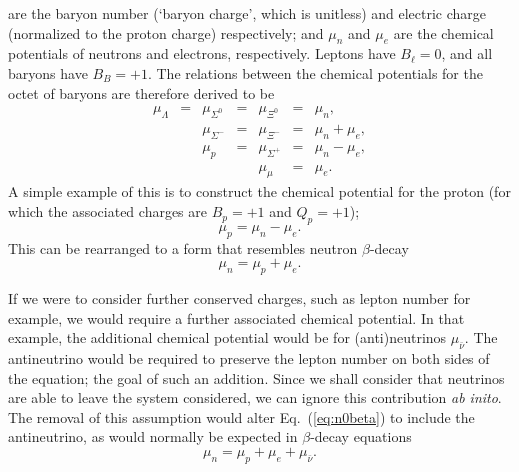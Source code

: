 \documentclass[11pt,a4paper,twoside]{carrollthesis}
\newcommand{\be}{\begin{equation}}
\newcommand{\ee}{\end{equation}}
\begin{document}
are the baryon number (`baryon charge', which is unitless) and
electric charge (normalized to the proton charge) respectively; and
$\mu_n$ and $\mu_e$ are the chemical potentials of neutrons and
electrons, respectively. Leptons have $B_\ell=0$, and all baryons have
$B_B=+1$. The relations between the chemical potentials for the octet
of baryons are therefore derived to be
%
\be \label{eq:allmus}
\begin{array}{rcrcrcl}
\mu_\Lambda &=& \mu_{\Sigma^0} &=& \mu_{\Xi^0} &=& \mu_n, \\
&&\mu_{\Sigma^-} &=& \mu_{\Xi^-} &=& \mu_n + \mu_e, \\
&&\mu_p &=& \mu_{\Sigma^+} &=& \mu_n - \mu_e, \\
&&&& \mu_\mu &=& \mu_e.
\end{array}
\ee
%
A simple example of this is to construct the chemical potential for
the proton (for which the associated charges are $B_p = +1$ and $ Q_p
= +1$);
%
\be \label{eq:betaeq} \mu_p = \mu_n - \mu_e.  \ee
%
This can be rearranged to a form that resembles neutron $\beta$-decay
%
\be
\label{eq:n0beta}
\mu_n = \mu_p + \mu_e.  \ee
%
\par
%
If we were to consider further conserved charges, such as lepton
number for example, we would require a further associated chemical
potential. In that example, the additional chemical potential would be
for (anti)neutrinos $\mu_{\bar{\nu}}$. The antineutrino would be
required to preserve the lepton number on both sides of the equation;
the goal of such an addition. Since we shall consider that neutrinos
are able to leave the system considered, we can ignore this
contribution {\it ab inito}. The removal of this assumption would
alter Eq.~(\ref{eq:n0beta}) to include the antineutrino, as would
normally be expected in $\beta$-decay equations
%
\be \mu_n = \mu_p + \mu_e + \mu_{\bar{\nu}}.  \ee
%
\end{document}
